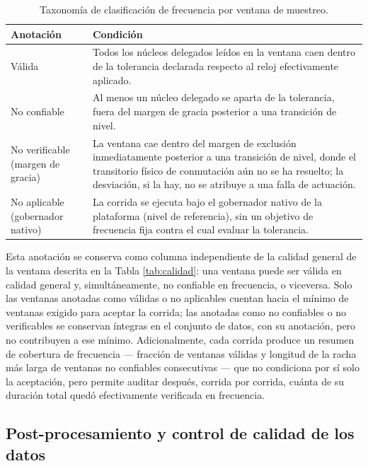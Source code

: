 \documentclass[12pt,oneside,spanish]{book}
\begin{document}
\begin{table}[H]
\centering
\caption[Taxonomía de clasificación de frecuencia]{Taxonomía de clasificación de frecuencia por ventana de muestreo.}
\label{tab:frecuencia-clasificacion}
\begin{tabular}{@{}p{4.3cm}p{10.2cm}@{}}
\toprule
\textbf{Anotación} & \textbf{Condición} \\
\midrule
Válida & Todos los núcleos delegados leídos en la ventana caen dentro de la tolerancia declarada respecto al reloj efectivamente aplicado. \\
No confiable & Al menos un núcleo delegado se aparta de la tolerancia, fuera del margen de gracia posterior a una transición de nivel. \\
No verificable (margen de gracia) & La ventana cae dentro del margen de exclusión inmediatamente posterior a una transición de nivel, donde el transitorio físico de conmutación aún no se ha resuelto; la desviación, si la hay, no se atribuye a una falla de actuación. \\
No aplicable (gobernador nativo) & La corrida se ejecuta bajo el gobernador nativo de la plataforma (nivel de referencia), sin un objetivo de frecuencia fija contra el cual evaluar la tolerancia. \\
\bottomrule
\end{tabular}
\end{table}

Esta anotación se conserva como columna independiente de la calidad general de la ventana descrita en la Tabla \ref{tab:calidad}: una ventana puede ser válida en calidad general y, simultáneamente, no confiable en frecuencia, o viceversa. Solo las ventanas anotadas como válidas o no aplicables cuentan hacia el mínimo de ventanas exigido para aceptar la corrida; las anotadas como no confiables o no verificables se conservan íntegras en el conjunto de datos, con su anotación, pero no contribuyen a ese mínimo. Adicionalmente, cada corrida produce un resumen de cobertura de frecuencia --- fracción de ventanas válidas y longitud de la racha más larga de ventanas no confiables consecutivas --- que no condiciona por sí solo la aceptación, pero permite auditar después, corrida por corrida, cuánta de su duración total quedó efectivamente verificada en frecuencia.

\subsection{Post-procesamiento y control de calidad de los datos}
\end{document}
